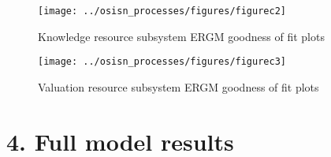 \documentclass[twoside,12pt,final]{ucthesis-CA2012}
\begin{document}
\begin{ucmainmatter}
\begin{figure}
{\centering \texttt{[image: ../osisn\_processes/figures/figurec2]} 

}

\caption{Knowledge resource subsystem ERGM goodness of fit plots}\label{fig:unnamed-chunk-44}
\end{figure}
\begin{figure}

{\centering \texttt{[image: ../osisn\_processes/figures/figurec3]} 

}

\caption{Valuation resource subsystem ERGM goodness of fit plots}\label{fig:unnamed-chunk-45}
\end{figure}
\hypertarget{full-model-results-1}{%
\section{4. Full model results}\label{full-model-results-1}}
\begin{table}


\end{table}
\end{ucmainmatter}
\end{document}
